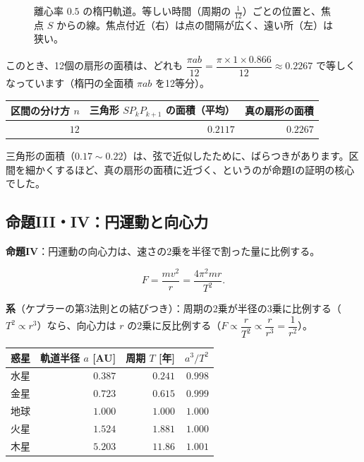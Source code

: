 \documentclass[a4paper,11pt,openany]{ltjsbook}
\begin{document}
\begin{figure}[htbp]
\centering
{}
\caption{離心率 $0.5$ の楕円軌道。等しい時間（周期の $\frac1{12}$）ごとの位置と、焦点 $S$ からの線。焦点付近（右）は点の間隔が広く、遠い所（左）は狭い。}
\end{figure}

このとき、12個の扇形の面積は、どれも $\dfrac{\pi ab}{12}=\dfrac{\pi\times1\times0.866}{12}\approx0.2267$ で等しくなっています（楕円の全面積 $\pi ab$ を12等分）。

\begin{center}
\begin{tabular}{rrr}
\toprule
区間の分け方 $n$ & 三角形 $S P_kP_{k+1}$ の面積（平均） & 真の扇形の面積\\
\midrule
$12$ & $0.2117$ & $0.2267$\\
\bottomrule
\end{tabular}
\end{center}

三角形の面積（$0.17\sim0.22$）は、弦で近似したために、ばらつきがあります。区間を細かくするほど、真の扇形の面積に近づく、というのが命題Iの証明の核心でした。

\subsection{命題III・IV：円運動と向心力}

\textbf{命題IV}：円運動の向心力は、速さの2乗を半径で割った量に比例する。

\[
F=\frac{mv^2}{r}=\frac{4\pi^2mr}{T^2}.
\]

\textbf{系}（ケプラーの第3法則との結びつき）：周期の2乗が半径の3乗に比例する（$T^2\propto r^3$）なら、向心力は $r$ の2乗に反比例する（$F\propto\dfrac{r}{T^2}\propto\dfrac{r}{r^3}=\dfrac{1}{r^2}$）。

\begin{center}
\renewcommand{\arraystretch}{1.3}
\begin{tabular}{lrrr}
\toprule
惑星 & 軌道半径 $a$ [AU] & 周期 $T$ [年] & $a^3/T^2$\\
\midrule
水星 & $0.387$ & $0.241$ & $0.998$\\
金星 & $0.723$ & $0.615$ & $0.999$\\
地球 & $1.000$ & $1.000$ & $1.000$\\
火星 & $1.524$ & $1.881$ & $1.000$\\
木星 & $5.203$ & $11.86$ & $1.001$\\
\bottomrule
\end{tabular}
\end{center}
\end{document}
